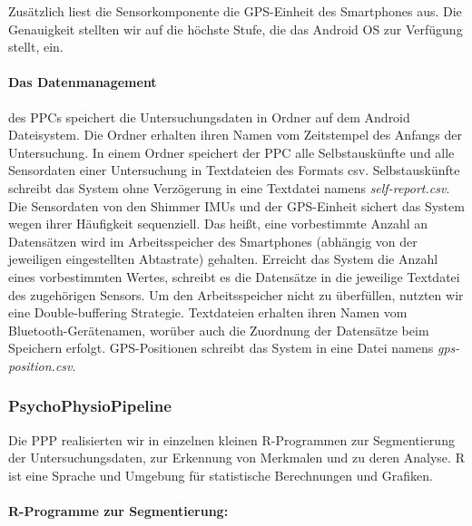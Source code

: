 \newpage

Zusätzlich liest die Sensorkomponente die \acs{GPS}-Einheit des Smartphones aus. Die Genauigkeit stellten wir auf die höchste Stufe, die das Android OS zur Verfügung stellt, ein.

\paragraph{Das Datenmanagement} 

\label{par:das_datenmanagement} des \ac{PPC}s speichert die Untersuchungsdaten in Ordner auf dem Android Dateisystem. Die Ordner erhalten ihren Namen vom Zeitstempel des Anfangs der Untersuchung. In einem Ordner speichert der \ac{PPC} alle Selbstauskünfte und alle Sensordaten einer Untersuchung in Textdateien des Formats \acs{csv}. Selbstauskünfte schreibt das System ohne Verzögerung in eine Textdatei namens \emph{self-report.\acs{csv}}. Die Sensordaten von den Shimmer \acp{IMU} und der \acs{GPS}-Einheit sichert das System wegen ihrer Häufigkeit sequenziell. Das heißt, eine vorbestimmte Anzahl an Datensätzen wird im Arbeitsspeicher des Smartphones (abhängig von der jeweiligen eingestellten Abtastrate) gehalten. Erreicht das System die Anzahl eines vorbestimmten Wertes, schreibt es die Datensätze in die jeweilige Textdatei des zugehörigen Sensors. Um den Arbeitsspeicher nicht zu überfüllen, nutzten wir eine Double-buffering Strategie. Textdateien erhalten ihren Namen vom Bluetooth-Gerätenamen, worüber auch die Zuordnung der Datensätze beim Speichern erfolgt. \acs{GPS}-Positionen schreibt das System in eine Datei namens \emph{gps-position.\acs{csv}}.

\subsubsection{PsychoPhysioPipeline} 

\label{ssub:psychophysiopipeline}

Die \ac{PPP} realisierten wir in einzelnen kleinen R-Programmen zur Segmentierung der Untersuchungsdaten, zur Erkennung von Merkmalen und zu deren Analyse. R ist eine Sprache und Umgebung für statistische Berechnungen und Grafiken.

\paragraph{R-Programme zur Segmentierung:} 

